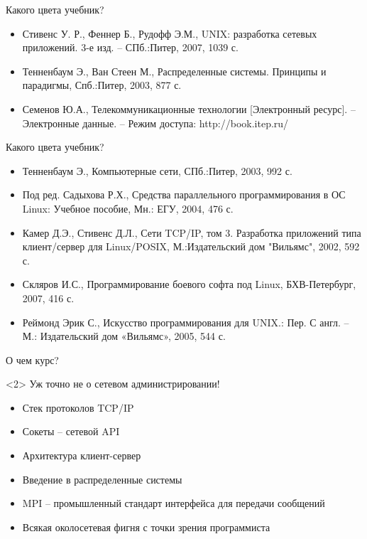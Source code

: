 \begin{frame}{Какого цвета учебник?}
	\begin{itemize}
		\item Стивенс У. Р.,  Феннер Б.,  Рудофф Э.М.,  UNIX: разработка сетевых приложений. 3-е изд. – СПб.:Питер,  2007,  1039 с.
		\item Тенненбаум Э.,  Ван Стеен М.,  Распределенные системы. Принципы и парадигмы,  Спб.:Питер,  2003,  877 с.
		\item Семенов Ю.А.,  Телекоммуникационные технологии [Электронный ресурс]. – Электронные данные. – Режим доступа: http://book.itep.ru/
	\end{itemize}
\end{frame}

\begin{frame}{Какого цвета учебник?}
	\begin{itemize}
		\item Тенненбаум Э.,  Компьютерные сети,  СПб.:Питер,  2003,  992 с.
		\item Под ред. Садыхова Р.Х.,  Средства параллельного программирования в ОС Linux: Учебное пособие,  Мн.: ЕГУ,  2004,  476 с.
		\item Камер Д.Э.,  Стивенс Д.Л.,  Сети TCP/IP,  том 3. Разработка приложений типа клиент/сервер для Linux/POSIX,  М.:Издательский дом "Вильямс",  2002,  592 с.
		\item Скляров И.С.,  Программирование боевого софта под Linux,  БХВ-Петербург,  2007,  416 с.
		\item Реймонд Эрик С.,  Искусство программирования для UNIX.: Пер. С англ. – М.: Издательский дом «Вильямс»,  2005,  544 с.
	\end{itemize}
\end{frame}



\begin{frame}{О чем курс?}
	\pause
	\begin{block}{}<2>
Уж точно не о сетевом администрировании!
	\end{block}
	\pause
	\begin{itemize}
		\item Стек протоколов TCP/IP
			\pause
		\item Сокеты -- сетевой API
			\pause
		\item Архитектура клиент-сервер
			\pause
		\item Введение в распределенные системы
			\pause
		\item MPI -- промышленный стандарт интерфейса для передачи сообщений
			\pause
		\item Всякая околосетевая фигня с точки зрения программиста
	\end{itemize}
\end{frame}

